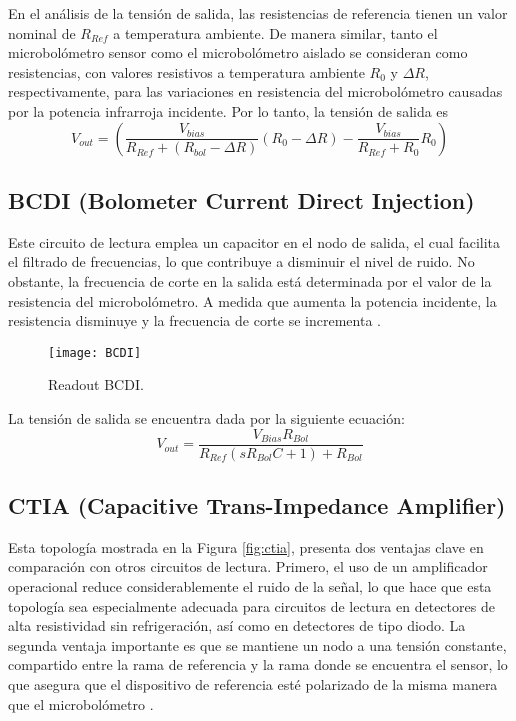 En el análisis de la tensión de salida, las resistencias de referencia tienen un valor nominal de $R_{Ref}$ a temperatura ambiente. De manera similar, tanto el microbolómetro sensor como el microbolómetro aislado se consideran como resistencias, con valores resistivos a temperatura ambiente $R_{0}$ y $\Delta R$, respectivamente, para las variaciones en resistencia del microbolómetro causadas por la potencia infrarroja incidente. Por lo tanto, la tensión de salida es \cite{BlancoMDA}
        \begin{equation}
        V_{out} =\left(\frac{V_{bias}}{R_{Ref} + (R_{bol} - \Delta R)}(R_{0} - \Delta R)- \frac{V_{bias}}{R_{Ref}+ R_{0}}R_{0} \right)
        \label{eq:Puente}
        \end{equation} 

\subsection{BCDI (Bolometer Current Direct Injection)}
Este circuito de lectura emplea un capacitor en el nodo de salida, el cual facilita el filtrado de frecuencias, lo que contribuye a disminuir el nivel de ruido. No obstante, la frecuencia de corte en la salida está determinada por el valor de la resistencia del microbolómetro. A medida que aumenta la potencia incidente, la resistencia disminuye y la frecuencia de corte se incrementa \cite{BlancoMDA}.
            \begin{figure}[hbtp]
                \centering
                \texttt{[image: BCDI]}
                \caption{Readout BCDI.}
                \label{fig:BCDI}
            \end{figure}

La tensión de salida se encuentra dada por la siguiente ecuación:
        \begin{equation}
        V_{out} =\frac{V_{Bias} R_{Bol}}{R_{Ref} (sR_{Bol} C+1) + R_{Bol}}
        \label{eq:bcdi}
        \end{equation}
\subsection{CTIA (Capacitive Trans-Impedance Amplifier)}

Esta topología mostrada en la Figura \ref{fig:ctia}, presenta dos ventajas clave en comparación con otros circuitos de lectura. Primero, el uso de un amplificador operacional reduce considerablemente el ruido de la señal, lo que hace que esta topología sea especialmente adecuada para circuitos de lectura en detectores de alta resistividad sin refrigeración, así como en detectores de tipo diodo. La segunda ventaja importante es que se mantiene un nodo a una tensión constante, compartido entre la rama de referencia y la rama donde se encuentra el sensor, lo que asegura que el dispositivo de referencia esté polarizado de la misma manera que el microbolómetro \cite{BlancoMDA}.

